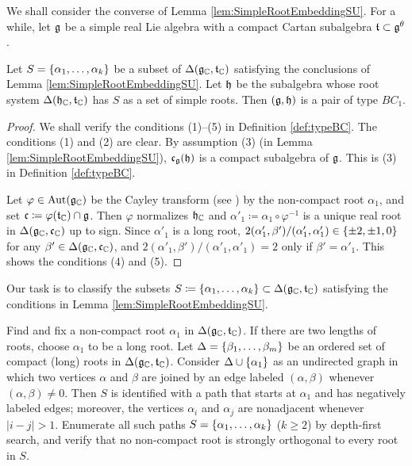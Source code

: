 We shall consider the converse of Lemma \ref{lem:SimpleRootEmbeddingSU}.
For a while, let $\mathfrak{g}$ be a simple real Lie algebra with a compact Cartan subalgebra $\mathfrak{t} \subset \mathfrak{g}^\theta$.

\begin{lemma} \label{lem:SimpleRootEmbeddingSUInv}
	Let $S = \left\{\alpha_1, \ldots, \alpha_k \right\}$ be a subset of $\Delta(\mathfrak{g}_{\mathbb{C}}, \mathfrak{t}_{\mathbb{C}})$ satisfying the conclusions of Lemma \ref{lem:SimpleRootEmbeddingSU}.
	Let $\mathfrak{h}$ be the subalgebra whose root system $\Delta(\mathfrak{h}_{\mathbb{C}}, \mathfrak{t}_{\mathbb{C}})$ has $S$ as a set of simple roots.
	Then $(\mathfrak{g}, \mathfrak{h})$ is a pair of type $BC_1$.
\end{lemma}

\begin{proof}
	We shall verify the conditions (1)--(5) in Definition \ref{def:typeBC}.
	The conditions (1) and (2) are clear.
	By assumption (3) (in Lemma \ref{lem:SimpleRootEmbeddingSU}), $\mathfrak{c}_{\mathfrak{g}}(\mathfrak{h})$ is a compact subalgebra of $\mathfrak{g}$.
	This is (3) in Definition \ref{def:typeBC}.

	Let $\varphi \in \operatorname{Aut}(\mathfrak{g}_{\mathbb{C}})$ be the Cayley transform (see \cite[Chapter VI.7]{Kn02}) by the non-compact root $\alpha_1$, and set $\mathfrak{c} \coloneq \varphi(\mathfrak{t}_{\mathbb{C}}) \cap \mathfrak{g}$.
	Then $\varphi$ normalizes $\mathfrak{h}_{\mathbb{C}}$ and $\alpha'_1\coloneq \alpha_1 \circ \varphi^{-1}$ is a unique real root in $\Delta(\mathfrak{g}_{\mathbb{C}}, \mathfrak{c}_{\mathbb{C}})$ up to sign.
	Since $\alpha'_1$ is a long root, $2(\alpha'_1, \beta')/(\alpha'_1, \alpha'_1) \in \left\{\pm 2, \pm 1, 0 \right\}$ for any $\beta' \in \Delta(\mathfrak{g}_{\mathbb{C}}, \mathfrak{c}_{\mathbb{C}})$, and $2(\alpha'_1, \beta')/(\alpha'_1, \alpha'_1) = 2$ only if $\beta' = \alpha'_1$.
	This shows the conditions (4) and (5).
\end{proof}

Our task is to classify the subsets $S\coloneq \left\{\alpha_1, \ldots, \alpha_k \right\} \subset \Delta(\mathfrak{g}_{\mathbb{C}}, \mathfrak{t}_{\mathbb{C}})$ satisfying the conditions in Lemma \ref{lem:SimpleRootEmbeddingSU}.

\begin{algorithm} \label{alg:EmbeddingSU}
	Find and fix a non-compact root $\alpha_1$ in $\Delta(\mathfrak{g}_{\mathbb{C}}, \mathfrak{t}_{\mathbb{C}})$.
	If there are two lengths of roots, choose $\alpha_1$ to be a long root.
	Let $\Delta = \left\{\beta_1, \ldots, \beta_m \right\}$ be an ordered set of compact (long) roots in $\Delta(\mathfrak{g}_{\mathbb{C}}, \mathfrak{t}_{\mathbb{C}})$.
	Consider $\Delta \cup \left\{\alpha_1 \right\}$ as an undirected graph in which two vertices $\alpha$ and $\beta$ are joined by an edge labeled $(\alpha, \beta)$ whenever $(\alpha, \beta) \neq 0$.
	Then $S$ is identified with a path that starts at $\alpha_1$ and has negatively labeled edges; moreover, the vertices $\alpha_i$ and $\alpha_j$ are nonadjacent whenever $|i-j|>1$.
	Enumerate all such paths $S = \left\{\alpha_1, \ldots, \alpha_k \right\}$ ($k\geq 2$) by depth-first search, and verify that no non-compact root is strongly orthogonal to every root in $S$.
\end{algorithm}

